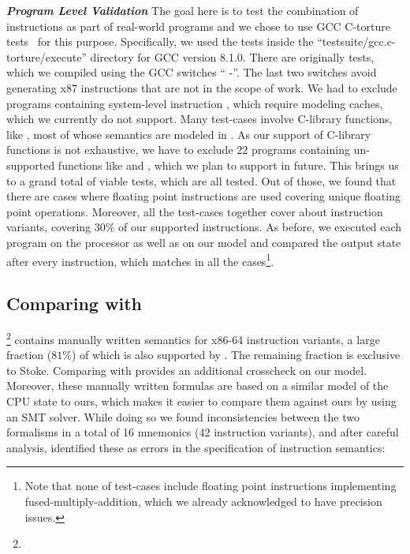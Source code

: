 \vspace{2pt}
\noindent\textbf{\emph{Program Level Validation}}\;\;
The goal here is to test the combination of instructions as part of real-world programs and we chose to use GCC C-torture tests~\cite{CTORTURE} for this purpose. Specifically, we used the tests inside the ``testsuite/gcc.c-torture/execute'' directory for GCC version 8.1.0.  
There are originally \TortureTotal{} tests, which we compiled using the GCC switches ``     -''. The last two switches avoid generating x87 instructions that are not in the scope of work. We had to exclude \TortureExclude{} programs containing system-level instruction , which require modeling caches, which we currently do not support. Many test-cases involve C-library functions, like , most of whose semantics are modeled in \K. As our support of C-library functions is not exhaustive, we have to exclude $22$ programs containing un-supported functions like  and , which we plan to support in future. This brings us to a grand total of \TortureInclude{} viable tests, which are all tested. Out of those, we found that there are \TortureUifsInstr{} cases where floating point instructions are used covering \TortureUifs{} unique floating point operations. Moreover, all the test-cases together cover about \TortureCoverage{} instruction variants, covering  $30\%$ of our supported instructions. As before, we executed each program on the processor as well as  on our model and compared the output state after every instruction, which matches in all the cases\footnote{Note that none of test-cases include floating point instructions implementing fused-multiply-addition, which we already acknowledged to have precision issues.}. 


\subsection{Comparing with \Stoke}\label{subsec:compare-stoke}
\footnote{} contains manually written semantics for \stokeIS{} x86-64 instruction variants, a large fraction ($81\%$) of which is also supported by \Strata. The remaining fraction is exclusive to Stoke. Comparing with \Stoke provides an additional crosscheck on our model.  Moreover, these manually written formulas are based on a similar model of the CPU state to ours, which makes it easier to compare them against ours by using an SMT solver. While doing so we found inconsistencies between the two formalisms in a total of 16 mnemonics (42 instruction variants), and after careful analysis, identified these as errors in the \Stoke specification of instruction semantics:

